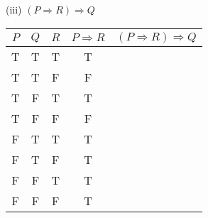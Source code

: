 \documentclass{article}
\begin{document}
(iii) $(P \Rightarrow R) \Rightarrow Q$\\
\begin{tabular}{|c|c|c|c|c|}
    \hline
    $P$ & $Q$ & $R$ & $P \Rightarrow R$ & $(P \Rightarrow R) \Rightarrow Q$ \\
    \hline
    T   & T   & T   & T                 &                                   \\
    T   & T   & F   & F                 &                                   \\
    T   & F   & T   & T                 &                                   \\
    T   & F   & F   & F                 &                                   \\
    F   & T   & T   & T                 &                                   \\
    F   & T   & F   & T                 &                                   \\
    F   & F   & T   & T                 &                                   \\
    F   & F   & F   & T                 &                                   \\
    \hline
\end{tabular}
\end{document}
